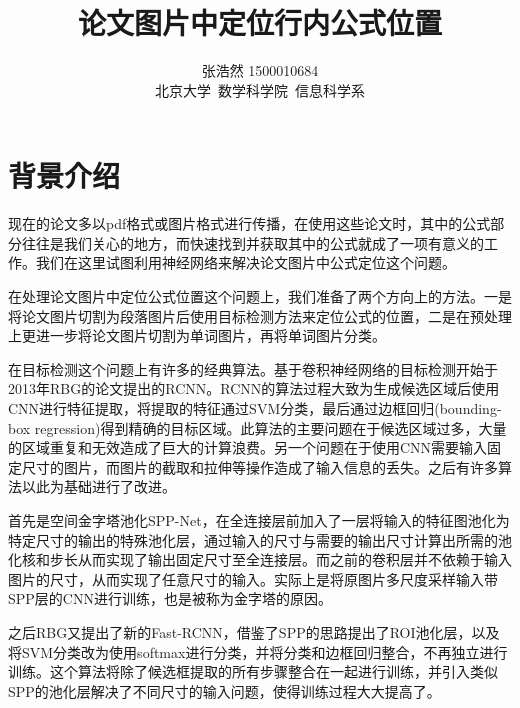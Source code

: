 \documentclass[12pt]{article}
\title{论文图片中定位行内公式位置}
\author{张浩然 1500010684 \\ 北京大学~数学科学院~信息科学系}
\date{}
\begin{document}


\maketitle
\tableofcontents

\newpage
{}

\section{背景介绍}
\noindent

现在的论文多以pdf格式或图片格式进行传播，在使用这些论文时，其中的公式部分往往是我们关心的地方，而快速找到并获取其中的公式就成了一项有意义的工作。我们在这里试图利用神经网络来解决论文图片中公式定位这个问题。

在处理论文图片中定位公式位置这个问题上，我们准备了两个方向上的方法。一是将论文图片切割为段落图片后使用目标检测方法来定位公式的位置，二是在预处理上更进一步将论文图片切割为单词图片，再将单词图片分类。

在目标检测这个问题上有许多的经典算法。基于卷积神经网络的目标检测开始于2013年RBG的论文\cite{rcnn}提出的RCNN。RCNN的算法过程大致为生成候选区域后使用CNN进行特征提取，将提取的特征通过SVM分类，最后通过边框回归(bounding-box regression)得到精确的目标区域。此算法的主要问题在于候选区域过多，大量的区域重复和无效造成了巨大的计算浪费。另一个问题在于使用CNN需要输入固定尺寸的图片，而图片的截取和拉伸等操作造成了输入信息的丢失。之后有许多算法以此为基础进行了改进。

首先是空间金字塔池化SPP-Net\cite{spp}，在全连接层前加入了一层将输入的特征图池化为特定尺寸的输出的特殊池化层，通过输入的尺寸与需要的输出尺寸计算出所需的池化核和步长从而实现了输出固定尺寸至全连接层。而之前的卷积层并不依赖于输入图片的尺寸，从而实现了任意尺寸的输入。实际上是将原图片多尺度采样输入带SPP层的CNN进行训练，也是被称为金字塔的原因。

之后RBG又提出了新的Fast-RCNN\cite{frcnn}，借鉴了SPP的思路提出了ROI池化层，以及将SVM分类改为使用softmax进行分类，并将分类和边框回归整合，不再独立进行训练。这个算法将除了候选框提取的所有步骤整合在一起进行训练，并引入类似SPP的池化层解决了不同尺寸的输入问题，使得训练过程大大提高了。
\end{document}

